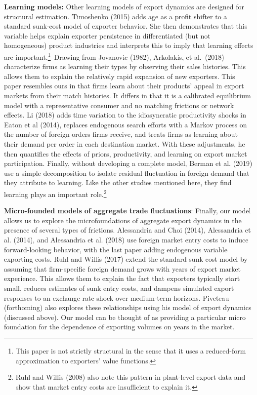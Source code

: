 \documentclass[12pt]{article}
\begin{document}
\textbf{Learning models:} Other learning models of export dynamics are
designed for structural estimation. Timoshenko (2015) adds age as a profit
shifter to a standard sunk-cost model of exporter behavior. She then
demonstrates that this variable helps explain exporter persistence in
differentiated (but not homogeneous) product industries and interprets this
to imply that learning effects are important.\footnote{%
This paper is not strictly structural in the sense that it uses a
reduced-form approximation to exporters' value functions.}\ Drawing from
Jovanovic (1982), Arkolakis, et al.\ (2018) characterize firms as learning
their types by observing their sales histories. This allows them to explain
the relatively rapid expansion of new exporters. This paper resembles ours
in that firms learn about their products' appeal in export markets from
their match histories. It differs in that it is a calibrated equilibrium
model with a representative consumer and no matching frictions or network
effects. Li (2018) adds time variation to the idiosyncratic productivity
shocks in Eaton et al (2014), replaces endogenous search efforts with a
Markov process on the number of foreign orders firms receive, and treats
firms as learning about their demand per order in each destination market.
With these adjustments, he then quantifies the effects of priors,
productivity, and learning on export market participation. Finally, without
developing a complete model, Berman et al. (2019) use a simple decomposition
to isolate residual fluctuation in foreign demand that they attribute to
learning. Like the other studies mentioned here, they find learning plays an
important role.\renewcommand{\baselinestretch}{1}\footnote{%
Ruhl and Willis (2008) also note this pattern in plant-level export data and
show that market entry costs are insufficient to explain it.}

\textbf{Micro-founded models of aggregate trade fluctuations}: Finally, our
model allows us to explore the microfoundations of aggregate export dynamics
in the presence of several types of frictions. Alessandria and Choi (2014),
Alessandria et al. (2014), and Alessandria et al. (2018) use foreign market
entry costs to induce forward-looking behavior, with the last paper adding
endogenous variable exporting costs. Ruhl and Willis (2017) extend the
standard sunk cost model by assuming that firm-specific foreign demand grows
with years of export market experience. This allows them to explain the fact
that exporters typically start small, reduces estimates of sunk entry costs,
and dampens simulated export responses to an exchange rate shock over
medium-term horizons. Piveteau (forthoming) also explores these
relationships using his model of export dynamics (discussed above). Our
model can be thought of as providing a particular micro foundation for the
dependence of exporting volumes on years in the market.
\end{document}
